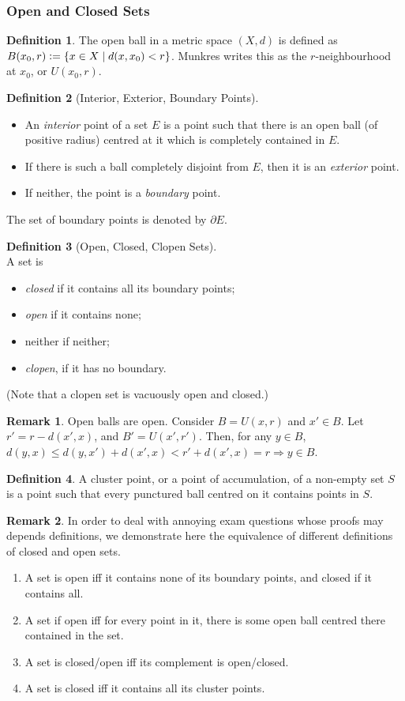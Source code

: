 \documentclass{article}
\newcommand{\vc}{\vcentcolon}
\theoremstyle{definition}
\newtheorem{defn}{Definition}[subsubsection]
\newtheorem{rmk}{Remark}[subsubsection]
\begin{document}
\subsubsection{Open and Closed Sets}
\begin{defn}
	The open ball in a metric space $(X,d)$ is defined as $B(x_0,r)\vc=\{x\in X\mid d(x,x_0)<r\}$. Munkres writes this as the $r$-neighbourhood at $x_0$, or $U(x_0,r)$.
\end{defn}
\begin{defn}[Interior, Exterior, Boundary Points]
	$ $\\
	\begin{itemize}
		\item An \emph{interior} point of a set $E$ is a point such that there is an open ball (of positive radius) centred at it which is completely contained in $E$.
		\item If there is such a ball completely disjoint from $E$, then it is an \emph{exterior} point.
		\item If neither, the point is a \emph{boundary} point.
	\end{itemize}
	The set of boundary points is denoted by $\partial E$.
\end{defn}
\begin{defn}[Open, Closed, Clopen Sets]
	$ $\\A set is
	\begin{itemize}
		\item \emph{closed} if it contains all its boundary points;
		\item \emph{open} if it contains none;
		\item neither if neither;
		\item \emph{clopen}, if it has no boundary.
	\end{itemize}
	(Note that a clopen set is vacuously open and closed.)
\end{defn}
\begin{rmk}
	Open balls are open. Consider $B=U(x,r)$ and $x'\in B$. Let $r'=r-d(x',x)$, and $B'=U(x',r')$. Then, for any $y\in B$, $d(y,x)\leq d(y,x')+d(x',x)<r'+d(x',x)=r\Rightarrow y\in B$.
\end{rmk}
\begin{defn}
	A cluster point, or a point of accumulation, of a non-empty set $S$ is a point such that every punctured ball centred on it contains points in $S$.
\end{defn}
\begin{rmk}
	In order to deal with annoying exam questions whose proofs may depends definitions, we demonstrate here the equivalence of different definitions of closed and open sets.
	\begin{enumerate}
		\item A set is open iff it contains none of its boundary points, and closed if it contains all.
		\item A set if open iff for every point in it, there is some open ball centred there contained in the set.
		\item A set is closed/open iff its complement is open/closed.
		\item A set is closed iff it contains all its cluster points.
	\end{enumerate}
\end{rmk}
\end{document}
